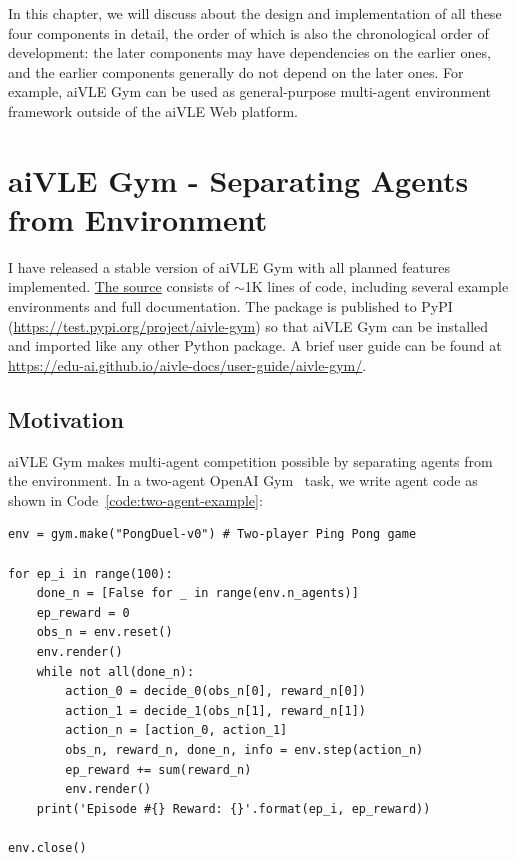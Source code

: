 In this chapter, we will discuss about the design and implementation of all these four components in detail, the order of which is also the chronological order of development: the later components may have dependencies on the earlier ones, and the earlier components generally do not depend on the later ones. For example, aiVLE Gym can be used as general-purpose multi-agent environment framework outside of the aiVLE Web platform.

\section{aiVLE Gym - Separating Agents from Environment}
\label{ch:aivle-gym}
I have released a stable version of aiVLE Gym with all planned features implemented. \href{https://github.com/edu-ai/aivle-gym}{The source} consists of $\sim$1K lines of code, including several example environments and full documentation. The package is published to PyPI  (\href{https://test.pypi.org/project/aivle-gym}{https://test.pypi.org/project/aivle-gym}) so that aiVLE Gym can be installed and imported like any other Python package. A brief user guide can be found at \href{https://edu-ai.github.io/aivle-docs/user-guide/aivle-gym/}{https://edu-ai.github.io/aivle-docs/user-guide/aivle-gym/}.

\subsection{Motivation}
aiVLE Gym makes multi-agent competition possible by separating agents from the environment. In a two-agent OpenAI Gym~\parencite{openai-gym} task, we write agent code as shown in Code~\ref{code:two-agent-example}:

\begin{code}
\begin{verbatim}
env = gym.make("PongDuel-v0") # Two-player Ping Pong game

for ep_i in range(100):
    done_n = [False for _ in range(env.n_agents)]
    ep_reward = 0
    obs_n = env.reset()
    env.render()
    while not all(done_n):
        action_0 = decide_0(obs_n[0], reward_n[0])
        action_1 = decide_1(obs_n[1], reward_n[1])
        action_n = [action_0, action_1]
        obs_n, reward_n, done_n, info = env.step(action_n)
        ep_reward += sum(reward_n)
        env.render()
    print('Episode #{} Reward: {}'.format(ep_i, ep_reward))

env.close()
\end{verbatim}
\label{code:two-agent-example}
\end{code}

